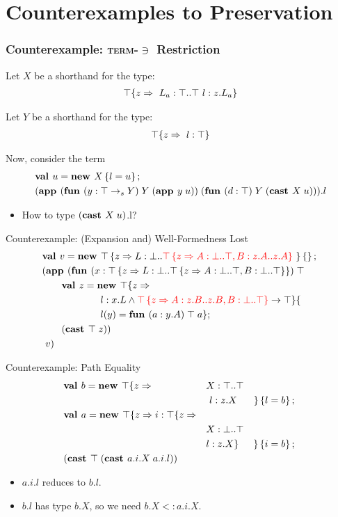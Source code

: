 \documentclass{beamer}
\begin{document}
\section{Counterexamples to Preservation}

\begin{frame}[fragile]
\frametitle{Counterexample: \texorpdfstring{\textsc{term-$\ni$}}{Term-Mem} Restriction}
Let $X$ be a shorthand for the type:
\begin{align*}
\top \{z \Rightarrow 
\ L_a : \top..\top
\ l : z.L_a
 \}
\end{align*}

Let $Y$ be a shorthand for the type:
\begin{align*}
\top \{z \Rightarrow 
\ l : \top
 \}
\end{align*}

Now, consider the term
\begin{align*}
&\mlnew u {X \ldefs{ l = u }}{
\app {(\fun y {\arrow \Top Y} {Y} {\app y u})} {(\fun d \Top Y {\cast X u})}.l
}
\end{align*}

\begin{itemize}
\item How to type ${(\textbf{cast }X\;u)}$.l?
\end{itemize}
\end{frame}

\begin{frame}[fragile]{Counterexample: (Expansion and) Well-Formedness Lost}
\begin{align*}
&\textbf{val }v = \textbf{new }\top \left\{z \Rightarrow L : \bot..{\color{red}{\top\left\{z \Rightarrow A : \bot..\top, B : z.A..z.A \right\}}}\  \right\} \left\{\right\} ;\;\\&
(\textbf{app }(\textbf{fun } (x:\top \left\{z \Rightarrow L : \bot..\top \left\{z \Rightarrow A : \bot..\top, B : \bot..\top \right\} \right\})\;\top\;\\&\quad\quad
\textbf{val }z = \textbf{new }\top \{z \Rightarrow \\&\quad\quad\quad\quad\quad\quad
l : x.L \wedge {\color{red}{\top\left\{z \Rightarrow A : z.B..z.B, B : \bot..\top\right\}}} \rightarrow \top \}\{\\&\quad\quad\quad\quad\quad\quad
l(y) = \textbf{fun } (a:y.A)\;\top\;a\} ;\;\\&
\quad\quad (\textbf{cast }\top\;z)
)\;\\&\ v)
\end{align*}
\end{frame}

\begin{frame}[fragile]{Counterexample: Path Equality}
\begin{align*}
&\textbf{val }b = \textbf{new }\top \{z \Rightarrow &&X : \top..\top&\\
&&&\ l : z.X& \}\left\{l = b\right\} ;\;\\&
\textbf{val }a = \textbf{new }\top \{z \Rightarrow i : \top \{z \Rightarrow &&&\\
&&&X : \bot..\top\\
&&&l : z.X \}& \}\left\{i = b\right\} ;\;\\&
{(\textbf{cast }\top\;(\textbf{cast }a.i.X\;a.i.l))}
\end{align*}

\begin{itemize}
\item $a.i.l$ reduces to $b.l$.
\item $b.l$ has type $b.X$, so we need $b.X <: a.i.X$.
\end{itemize}
\end{frame}
\end{document}
